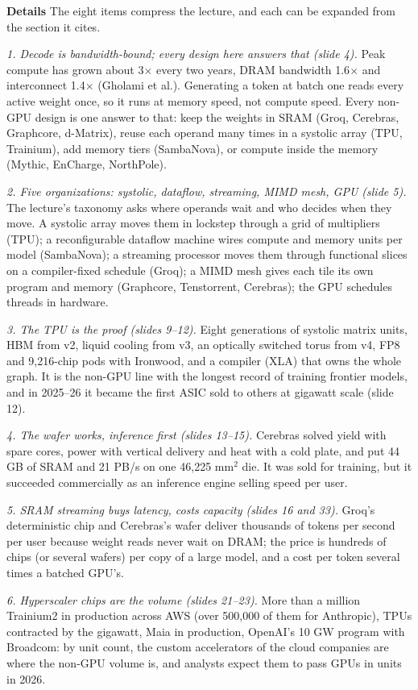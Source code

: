\documentclass[11pt,letterpaper]{article}
\newcommand{\para}[1]{\medskip\noindent\textbf{#1}\quad}
\begin{document}
\para{Details} The eight items compress the lecture, and each can be expanded from the section it cites.

\emph{1. Decode is bandwidth-bound; every design here answers that (slide 4).} Peak compute has grown about 3$\times$ every two years, DRAM bandwidth 1.6$\times$ and interconnect 1.4$\times$ (Gholami et al.). Generating a token at batch one reads every active weight once, so it runs at memory speed, not compute speed. Every non-GPU design is one answer to that: keep the weights in SRAM (Groq, Cerebras, Graphcore, d-Matrix), reuse each operand many times in a systolic array (TPU, Trainium), add memory tiers (SambaNova), or compute inside the memory (Mythic, EnCharge, NorthPole).

\emph{2. Five organizations: systolic, dataflow, streaming, MIMD mesh, GPU (slide 5).} The lecture's taxonomy asks where operands wait and who decides when they move. A systolic array moves them in lockstep through a grid of multipliers (TPU); a reconfigurable dataflow machine wires compute and memory units per model (SambaNova); a streaming processor moves them through functional slices on a compiler-fixed schedule (Groq); a MIMD mesh gives each tile its own program and memory (Graphcore, Tenstorrent, Cerebras); the GPU schedules threads in hardware.

\emph{3. The TPU is the proof (slides 9--12).} Eight generations of systolic matrix units, HBM from v2, liquid cooling from v3, an optically switched torus from v4, FP8 and 9{,}216-chip pods with Ironwood, and a compiler (XLA) that owns the whole graph. It is the non-GPU line with the longest record of training frontier models, and in 2025--26 it became the first ASIC sold to others at gigawatt scale (slide 12).

\emph{4. The wafer works, inference first (slides 13--15).} Cerebras solved yield with spare cores, power with vertical delivery and heat with a cold plate, and put 44 GB of SRAM and 21 PB/s on one 46{,}225 mm$^2$ die. It was sold for training, but it succeeded commercially as an inference engine selling speed per user.

\emph{5. SRAM streaming buys latency, costs capacity (slides 16 and 33).} Groq's deterministic chip and Cerebras's wafer deliver thousands of tokens per second per user because weight reads never wait on DRAM; the price is hundreds of chips (or several wafers) per copy of a large model, and a cost per token several times a batched GPU's.

\emph{6. Hyperscaler chips are the volume (slides 21--23).} More than a million Trainium2 in production across AWS (over 500{,}000 of them for Anthropic), TPUs contracted by the gigawatt, Maia in production, OpenAI's 10 GW program with Broadcom: by unit count, the custom accelerators of the cloud companies are where the non-GPU volume is, and analysts expect them to pass GPUs in units in 2026.
\end{document}
